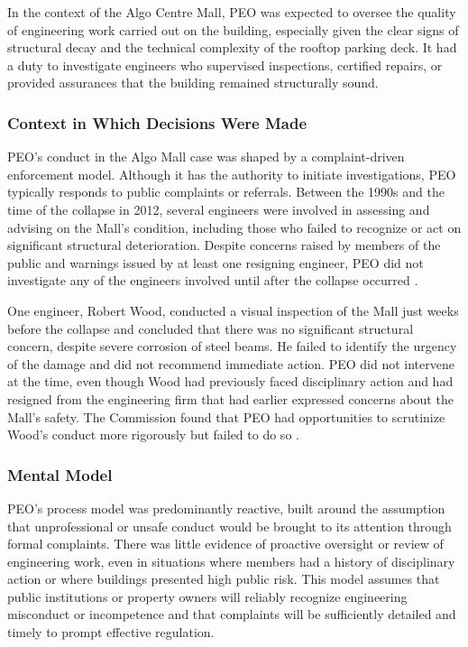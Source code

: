 \documentclass[12pt]{article}
\begin{document}
In the context of the Algo Centre Mall, PEO was expected to oversee the quality of engineering work carried out on the building, especially given the clear signs of structural decay and the technical complexity of the rooftop parking deck. It had a duty to investigate engineers who supervised inspections, certified repairs, or provided assurances that the building remained structurally sound.

\subsubsection*{Context in Which Decisions Were Made}

PEO's conduct in the Algo Mall case was shaped by a complaint-driven enforcement model. Although it has the authority to initiate investigations, PEO typically responds to public complaints or referrals. Between the 1990s and the time of the collapse in 2012, several engineers were involved in assessing and advising on the Mall's condition, including those who failed to recognize or act on significant structural deterioration. Despite concerns raised by members of the public and warnings issued by at least one resigning engineer, PEO did not investigate any of the engineers involved until after the collapse occurred \cite[p393-395]{AlgoLakeReport1}.

One engineer, Robert Wood, conducted a visual inspection of the Mall just weeks before the collapse and concluded that there was no significant structural concern, despite severe corrosion of steel beams. He failed to identify the urgency of the damage and did not recommend immediate action. PEO did not intervene at the time, even though Wood had previously faced disciplinary action and had resigned from the engineering firm that had earlier expressed concerns about the Mall's safety. The Commission found that PEO had opportunities to scrutinize Wood's conduct more rigorously but failed to do so \cite[p393-396]{AlgoLakeReport1}.

\subsubsection*{Mental Model}

PEO's process model was predominantly reactive, built around the assumption that unprofessional or unsafe conduct would be brought to its attention through formal complaints. There was little evidence of proactive oversight or review of engineering work, even in situations where members had a history of disciplinary action or where buildings presented high public risk. This model assumes that public institutions or property owners will reliably recognize engineering misconduct or incompetence and that complaints will be sufficiently detailed and timely to prompt effective regulation.
\end{document}
